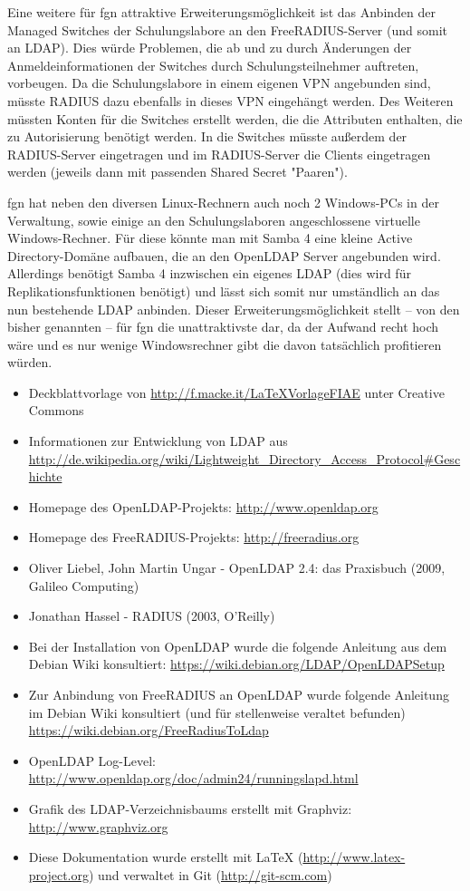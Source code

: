 \documentclass[11pt,a4paper,titlepage=firstiscover,headsepline,bibtotoc]{scrartcl} %
\newcommand{\hilight}[1]{\colorbox{yellow}{#1}} %
\begin{document}
Eine weitere für fgn attraktive Erweiterungsmöglichkeit ist das Anbinden der Managed Switches der Schulungslabore an den FreeRADIUS-Server (und somit an LDAP). Dies würde Problemen, die ab und zu durch Änderungen der Anmeldeinformationen der Switches durch Schulungsteilnehmer auftreten, vorbeugen. Da die Schulungslabore in einem eigenen VPN angebunden sind, müsste RADIUS dazu ebenfalls in dieses VPN eingehängt werden. Des Weiteren müssten Konten für die Switches erstellt werden, die die Attributen enthalten, die zu Autorisierung benötigt werden. In die Switches müsste außerdem der RADIUS-Server eingetragen und im RADIUS-Server die Clients eingetragen werden (jeweils dann mit passenden Shared Secret "Paaren").

fgn hat neben den diversen Linux-Rechnern auch noch 2 Windows-PCs in der Verwaltung, sowie einige an den Schulungslaboren angeschlossene virtuelle Windows-Rechner. Für diese könnte man mit Samba 4 eine kleine Active Directory-Domäne aufbauen, die an den OpenLDAP Server angebunden wird. Allerdings benötigt Samba 4 inzwischen ein eigenes LDAP (dies wird für Replikationsfunktionen benötigt) und lässt sich somit nur umständlich an das nun bestehende LDAP anbinden. Dieser Erweiterungsmöglichkeit stellt -- von den bisher genannten -- für fgn die unattraktivste dar, da der Aufwand recht hoch wäre und es nur wenige Windowsrechner gibt die davon tatsächlich profitieren würden.

\newpage
{}
\begin{itemize}
\item Deckblattvorlage von \url{http://f.macke.it/LaTeXVorlageFIAE} unter Creative Commons
\item Informationen zur Entwicklung von LDAP aus \url{http://de.wikipedia.org/wiki/Lightweight_Directory_Access_Protocol#Geschichte}
\item Homepage des OpenLDAP-Projekts: \url{http://www.openldap.org}
\item Homepage des FreeRADIUS-Projekts: \url{http://freeradius.org}
\item Oliver Liebel, John Martin Ungar - OpenLDAP 2.4: das Praxisbuch (2009, Galileo Computing)
\item Jonathan Hassel - RADIUS (2003, O'Reilly)
\item Bei der Installation von OpenLDAP wurde die folgende Anleitung aus dem Debian Wiki konsultiert: \url{https://wiki.debian.org/LDAP/OpenLDAPSetup}
\item Zur Anbindung von FreeRADIUS an OpenLDAP wurde folgende Anleitung im Debian Wiki konsultiert (und für stellenweise veraltet befunden) \url{https://wiki.debian.org/FreeRadiusToLdap}
\item OpenLDAP Log-Level: \url{http://www.openldap.org/doc/admin24/runningslapd.html}
\item Grafik des LDAP-Verzeichnisbaums erstellt mit Graphviz: \url{http://www.graphviz.org}
\item Diese Dokumentation wurde erstellt mit \LaTeX{} (\url{http://www.latex-project.org}) und verwaltet in Git (\url{http://git-scm.com})
\end{itemize}
\end{document}
